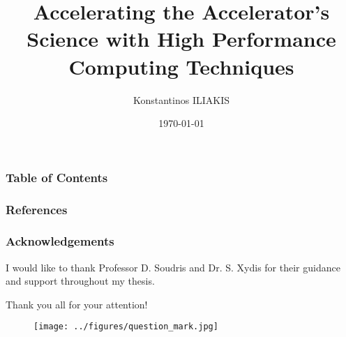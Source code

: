 \documentclass{beamer}
\title[HPC @ CERN]{Accelerating the Accelerator's Science with High Performance Computing Techniques} %
\author{Konstantinos ILIAKIS} %
\institute{CERN/NTUA} %
\date{\today} %
\begin{document}
\begin{frame}
\titlepage %
\end{frame}

\begin{frame}
\frametitle{Table of Contents} %
\tableofcontents
\end{frame}


%


\begin{frame}[allowframebreaks]
\printbibliography[heading=bibintoc]
	\frametitle{References}
	
\end{frame}


\begin{frame}
	\frametitle{Acknowledgements}
	I would like to thank Professor D. Soudris and Dr. S. Xydis for their guidance and support throughout my thesis.
	\par\vspace{10pt}
	\centerline{Thank you all for your attention!}
	\begin{figure}[h]
		\centering
		\texttt{[image: ../figures/question\_mark.jpg]}
	\end{figure}
\end{frame}

\end{document}
